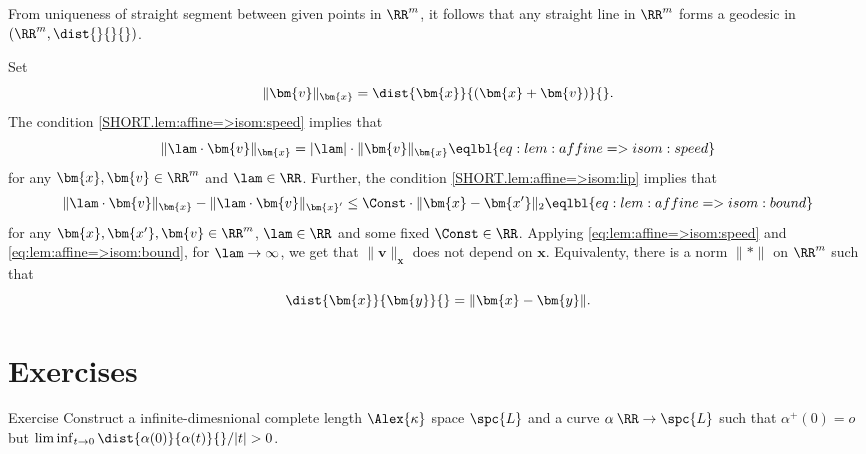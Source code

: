 From uniqueness of straight segment between given points in $\RR^m$,
it follows that any straight line in $\RR^m$ forms a geodesic in $(\RR^m,\dist{}{}{})$.

Set 
\[\|\bm{v}\|_{\bm{x}}=\dist{\bm{x}}{(\bm{x}+\bm{v})}{}.\]
The condition \ref{SHORT.lem:affine=>isom:speed} implies that 
\[ \|\lam\cdot\bm{v}\|_{\bm{x}}
=
|\lam|\cdot\|\bm{v}\|_{\bm{x}}
\eqlbl{eq:lem:affine=>isom:speed}\]
for any $\bm{x},\bm{v}\in\RR^m$ and $\lam\in\RR$.
Further, the condition \ref{SHORT.lem:affine=>isom:lip} implies that 
\[
\|\lam\cdot\bm{v}\|_{\bm{x}}
-
\|\lam\cdot\bm{v}\|_{\bm{x}'}
\le 
\Const\cdot \|\bm{x}-\bm{x'}\|_2
\eqlbl{eq:lem:affine=>isom:bound}\]
for any $\bm{x},\bm{x'},\bm{v}\in\RR^m$, 
$\lam\in\RR$
and some fixed $\Const\in\RR$.
Applying \ref{eq:lem:affine=>isom:speed} and \ref{eq:lem:affine=>isom:bound},
for $\lam\to\infty$, we get
 that
$\|\bm{v}\|_{\bm{x}}$ does not depend on $\bm{x}$.
Equivalenty, there is a norm $\|{*}\|$ on $\RR^m$ such that
\[\dist{\bm{x}}{\bm{y}}{}=\|\bm{x}-\bm{y}\|.\]
\qedsf



\section{Exercises}

\begin{thm}{Exercise}
Construct a infinite-dimesnional complete length $\Alex{\kappa}$ space $\spc{L}$ and a curve $\alpha\:\RR\to \spc{L}$ such that 
$\alpha^+(0)=o$ 
but $\liminf_{t\to 0}\dist{\alpha(0)}{\alpha(t)}{}/|t|>0$.
\end{thm}













